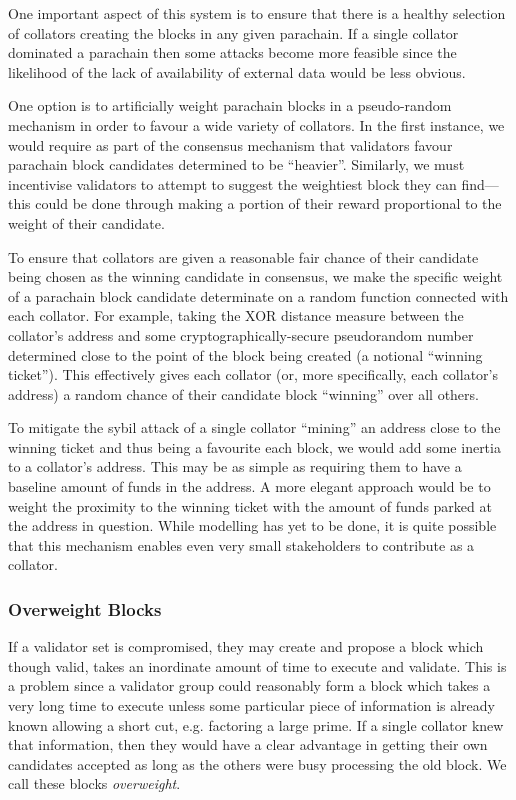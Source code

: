 \documentclass[9pt,oneside]{amsart}
\makeatletter
\newcommand*\eg{e.g.\@\xspace}
\makeatother
\begin{document}
\begin{multicols}{2}
 One important aspect of this system is to ensure that there is a healthy selection of collators creating the blocks in any given parachain. If a single collator dominated a parachain then some attacks become more feasible since the likelihood of the lack of availability of external data would be less obvious.

 One option is to artificially weight parachain blocks in a pseudo-random mechanism in order to favour a wide variety of collators. In the first instance, we would require as part of the consensus mechanism that validators favour parachain block candidates determined to be ``heavier''. Similarly, we must incentivise validators to attempt to suggest the weightiest block they can find---this could be done through making a portion of their reward proportional to the weight of their candidate.

 To ensure that collators are given a reasonable fair chance of their candidate being chosen as the winning candidate in consensus, we make the specific weight of a parachain block candidate determinate on a random function connected
with each collator. For example, taking the {\small XOR} distance measure between the collator's address and some cryptographically-secure pseudorandom number determined close to the point of the block being created (a notional ``winning ticket''). This effectively gives each collator (or, more specifically, each collator's address) a random chance of their candidate block ``winning'' over all others.

 To mitigate the sybil attack of a single collator ``mining'' an address close to the winning ticket and thus being a favourite each block, we would add some inertia to a collator's address. This may be as simple as requiring them to have a baseline amount of funds in the address. A more elegant approach would be to weight the proximity to the winning ticket with the amount of funds parked at the address in question. While modelling has yet to be done, it is quite possible that this mechanism enables even very small stakeholders to contribute as a collator.
 
 \subsubsection{Overweight Blocks}
 
If a validator set is compromised, they may create and propose a block which though valid, takes an inordinate amount of time to execute and validate. This is a problem since a validator group could reasonably form a block which takes a very long time to execute unless some particular piece of information is already known allowing a short cut, \eg factoring a large prime. If a single collator knew that information, then they would have a clear advantage in getting their own candidates accepted as long as the others were busy processing the old block. We call these blocks \textit{overweight}.


\end{multicols}
\end{document}
